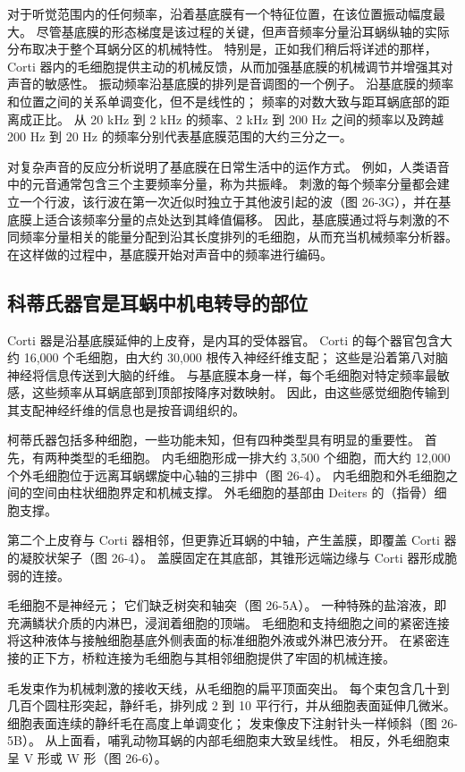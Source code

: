 对于听觉范围内的任何频率，沿着基底膜有一个特征位置，在该位置振动幅度最大。 尽管基底膜的形态梯度是该过程的关键，但声音频率分量沿耳蜗纵轴的实际分布取决于整个耳蜗分区的机械特性。 特别是，正如我们稍后将详述的那样，Corti 器内的毛细胞提供主动的机械反馈，从而加强基底膜的机械调节并增强其对声音的敏感性。 振动频率沿基底膜的排列是音调图的一个例子。 沿基底膜的频率和位置之间的关系单调变化，但不是线性的； 频率的对数大致与距耳蜗底部的距离成正比。 从 20 kHz 到 2 kHz 的频率、2 kHz 到 200 Hz 之间的频率以及跨越 200 Hz 到 20 Hz 的频率分别代表基底膜范围的大约三分之一。

对复杂声音的反应分析说明了基底膜在日常生活中的运作方式。 例如，人类语音中的元音通常包含三个主要频率分量，称为共振峰。 刺激的每个频率分量都会建立一个行波，该行波在第一次近似时独立于其他波引起的波（图 26-3G），并在基底膜上适合该频率分量的点处达到其峰值偏移。 因此，基底膜通过将与刺激的不同频率分量相关的能量分配到沿其长度排列的毛细胞，从而充当机械频率分析器。 在这样做的过程中，基底膜开始对声音中的频率进行编码。

\subsection{科蒂氏器官是耳蜗中机电转导的部位}
Corti 器是沿基底膜延伸的上皮脊，是内耳的受体器官。 Corti 的每个器官包含大约 16,000 个毛细胞，由大约 30,000 根传入神经纤维支配； 这些是沿着第八对脑神经将信息传送到大脑的纤维。 与基底膜本身一样，每个毛细胞对特定频率最敏感，这些频率从耳蜗底部到顶部按降序对数映射。 因此，由这些感觉细胞传输到其支配神经纤维的信息也是按音调组织的。

柯蒂氏器包括多种细胞，一些功能未知，但有四种类型具有明显的重要性。 首先，有两种类型的毛细胞。 内毛细胞形成一排大约 3,500 个细胞，而大约 12,000 个外毛细胞位于远离耳蜗螺旋中心轴的三排中（图 26-4）。 内毛细胞和外毛细胞之间的空间由柱状细胞界定和机械支撑。 外毛细胞的基部由 Deiters 的（指骨）细胞支撑。

第二个上皮脊与 Corti 器相邻，但更靠近耳蜗的中轴，产生盖膜，即覆盖 Corti 器的凝胶状架子（图 26-4）。 盖膜固定在其底部，其锥形远端边缘与 Corti 器形成脆弱的连接。

毛细胞不是神经元； 它们缺乏树突和轴突（图 26-5A）。 一种特殊的盐溶液，即充满鳞状介质的内淋巴，浸润着细胞的顶端。 毛细胞和支持细胞之间的紧密连接将这种液体与接触细胞基底外侧表面的标准细胞外液或外淋巴液分开。 在紧密连接的正下方，桥粒连接为毛细胞与其相邻细胞提供了牢固的机械连接。

毛发束作为机械刺激的接收天线，从毛细胞的扁平顶面突出。 每个束包含几十到几百个圆柱形突起，静纤毛，排列成 2 到 10 平行行，并从细胞表面延伸几微米。 细胞表面连续的静纤毛在高度上单调变化； 发束像皮下注射针头一样倾斜（图 26-5B）。 从上面看，哺乳动物耳蜗的内部毛细胞束大致呈线性。 相反，外毛细胞束呈 V 形或 W 形（图 26-6）。

